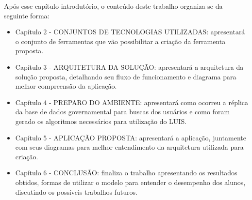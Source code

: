 Após esse capítulo introdutório, o conteúdo deste trabalho organiza-se da seguinte forma:
\begin{itemize}
	\item Capítulo 2 - \uppercase{Conjuntos de tecnologias utilizadas}: apresentará o conjunto de ferramentas que vão possibilitar a criação da ferramenta proposta.
	\item Capítulo 3 - \uppercase{Arquitetura da solução}: apresentará a arquitetura da solução proposta, detalhando seu fluxo de funcionamento e diagrama para melhor compreensão da aplicação.
	\item Capítulo 4 - \uppercase{Preparo do ambiente}: apresentará como ocorreu a réplica da base de dados governamental para buscas dos usuários e como foram gerado os algoritmos necessários para utilização do LUIS.
	\item Capítulo 5 - \uppercase{Aplicação proposta}: apresentará a aplicação, juntamente com seus diagramas para melhor entendimento da arquitetura utilizada para criação.
	\item Capítulo 6 - \uppercase{Conclusão}: finaliza o trabalho apresentando os resultados obtidos, formas de utilizar o modelo para entender o desempenho dos alunos, discutindo os possíveis trabalhos futuros.
\end{itemize}

